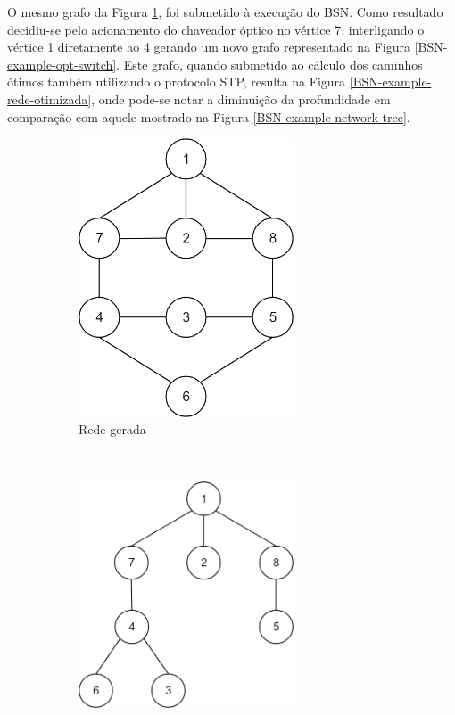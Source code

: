\documentclass[conference]{IEEEtran}
\begin{document}
O mesmo grafo da Figura \ref{BSN-example-network}, foi submetido à execução do BSN. Como resultado decidiu-se pelo acionamento do chaveador óptico no vértice 7, interligando o vértice 1 diretamente ao 4 gerando um novo grafo representado na Figura \ref{BSN-example-opt-switch}. Este grafo, quando submetido ao cálculo dos caminhos ótimos também utilizando o protocolo STP, resulta na Figura \ref{BSN-example-rede-otimizada}, onde pode-se notar a diminuição da profundidade em comparação com aquele mostrado na Figura \ref{BSN-example-network-tree}.

\begin{figure}[t!]
	\centering
	\begin{subfigure}[t]{0.2\textwidth}
		\centering
		\includegraphics[width=0.7\textwidth]{./figuras/BSN-ex-network-generation.png} %
		\caption{Rede gerada}
		\label{BSN-example-network}
	\end{subfigure}%
	~
	\begin{subfigure}[t]{0.2\textwidth}
		\centering
		\includegraphics[width=0.7\textwidth]{./figuras/BSN-ex-network-generation-tree.png} %

\end{subfigure}
\end{figure}
\end{document}
